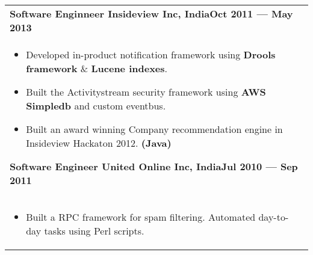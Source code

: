 \documentclass{article}
\begin{document}
\begin{tabular}{p{\dimexpr\linewidth-2\tabcolsep}}
	{\bfseries Software Enginneer \hfill Insideview Inc, India\hfill Oct 2011 --- May 2013} \\
	\begin{itemize}
		\item Developed in-product notification framework using \textbf{Drools framework} \& \textbf{Lucene indexes}.
		\item Built the Activitystream security framework using \textbf{AWS Simpledb} and custom eventbus.
		\item Built an award winning Company recommendation engine in Insideview Hackaton 2012. \textbf{(Java)}
	\end{itemize}

	\bigskip
	{\bfseries Software Engineer \hfill United Online Inc, India\hfill Jul 2010 --- Sep 2011} \\
	\begin{itemize}
		\item Built a RPC framework for spam filtering.  Automated day-to-day tasks using Perl scripts.
	\end{itemize}

\end{tabular}
\end{document}
